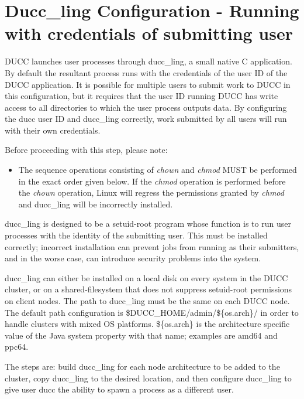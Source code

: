\section{Ducc\_ling Configuration - Running with credentials of submitting user}
\label{sec:duccling.install}

   DUCC launches user processes through ducc\_ling, a small native C application.
   By default the resultant process runs with the credentials of the user ID of
   the DUCC application. It is possible for multiple users to submit work to
   DUCC in this configuration, but it requires that the user ID running DUCC has
   write access to all directories to which the user process outputs data.
   By configuring the ducc user ID and ducc\_ling correctly, work submitted by
   all users will run with their own credentials.  

    Before proceeding with this step, please note: 
    \begin{itemize}
        \item The sequence operations consisting of {\em chown} and {\em chmod} MUST be performed
          in the exact order given below.  If the {\em chmod} operation is performed before
          the {\em chown} operation, Linux will regress the permissions granted by {\em chmod} 
          and ducc\_ling will be incorrectly installed.
    \end{itemize}

    ducc\_ling is designed to be a setuid-root program whose function is to run user processes with the identity of
    the submitting user. This must be installed correctly; incorrect installation can prevent jobs from running as
    their submitters, and in the worse case, can introduce security problems into the system.

    ducc\_ling can either be installed on a local disk on every system in the DUCC cluster, 
    or on a shared-filesystem that does not suppress setuid-root permissions on client nodes.
    The path to ducc\_ling must be the same on each DUCC node. 
    The default path configuration is
    \${DUCC\_HOME}/admin/\$\{os.arch\}/ in order to handle clusters with mixed OS platforms.
    \$\{os.arch\} is the architecture specific value of the Java system property with that name;
    examples are amd64 and ppc64.
   
	The steps are: build ducc\_ling for each node architecture to be added to the cluster,
	copy ducc\_ling to the desired location, and then configure ducc\_ling to give user
	ducc the ability to spawn a process as a different user.

